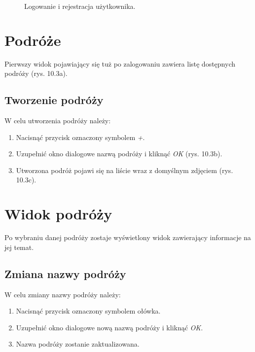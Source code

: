 \begin{figure}[h]

\centering
\null\hfill
{}
\hfill
{}
\hfill\null

\caption{Logowanie i rejestracja użytkownika.}
\label{fig:podrecznik1}
\end{figure}
\FloatBarrier

\section{Podróże}
Pierwszy widok pojawiający się tuż po zalogowaniu zawiera listę dostępnych podróży (rys. 10.3a).

\subsection{Tworzenie podróży}
W celu utworzenia podróży należy:
\begin{enumerate}
\item Nacisnąć przycisk oznaczony symbolem \textit{+}.
\item Uzupełnić okno dialogowe nazwą podróży i kliknąć \textit{OK} (rys. 10.3b).
\item Utworzona podróż pojawi się na liście wraz z domyślnym zdjęciem (rys. 10.3c).
\end{enumerate}

\section{Widok podróży}
Po wybraniu danej podróży zostaje wyświetlony widok zawierający informacje na jej temat.

\subsection{Zmiana nazwy podróży}

W celu zmiany nazwy podróży należy:
\begin{enumerate}
\item Nacisnąć przycisk oznaczony symbolem ołówka.
\item Uzupełnić okno dialogowe nową nazwą podróży i kliknąć \textit{OK}.
\item Nazwa podróży zostanie zaktualizowana.
\end{enumerate}

